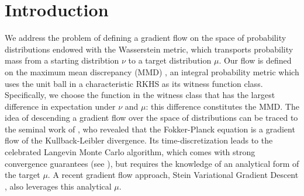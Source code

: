 \section{Introduction}




We address the problem of defining a gradient flow  on the space of probability distributions endowed with the Wasserstein metric, which transports probability mass from a starting distribtion $\nu$ to a target distribution $\mu$.   Our flow is defined on the maximum mean discrepancy (MMD) \cite{gretton2012kernel}, an integral probability metric \cite{Mueller97} which uses the unit ball in a characteristic RKHS \cite{sriperumbudur2010hilbert} as its witness function class.
Specifically, we choose the function in the witness class that has the largest difference in expectation under $\nu$ and $\mu$: this difference constitutes the MMD.
The idea of descending a gradient flow over the space of distributions can be traced to the seminal work of \cite{jordan1998variational}, who revealed that the Fokker-Planck equation is a gradient flow of the Kullback-Leibler divergence. Its time-discretization leads to the celebrated Langevin Monte Carlo algorithm, which comes with strong convergence guarantees  (see \cite{durmus2018analysis}), but requires the knowledge of an analytical form of the target $\mu$.
A recent gradient flow approach, Stein Variational Gradient Descent \cite{liu2017stein}, also  leverages this analytical $\mu$.









